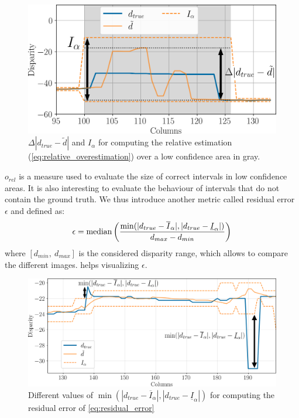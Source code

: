 \begin{figure}
    \centering
    \includegraphics[width=0.8\linewidth]{Images/Chap_5/relative_overestimation_row_230.png}
    \caption{$\Delta|d_{true}-\tilde{d}|$ and $I_\alpha$ for computing the relative estimation (\cref{eq:relative_overestimation}) over a low confidence area in gray.}
    \label{fig:relative_overestimation}
\end{figure}

$o_{rel}$ is a measure used to evaluate the size of correct intervals in low confidence areas. It is also interesting to evaluate the behaviour of intervals that do not contain the ground truth. We thus introduce another metric called residual error $\epsilon$ and defined as:
\begin{align}
    \epsilon=\operatorname*{median} \left( \dfrac{\min(|d_{true}-\overline{I}_\alpha|, |d_{true}-\underline{I}_\alpha|)}{d_{max}-d_{min}}\right)\label{eq:residual_error}
\end{align}
where $[d_{min}, ~d_{max}]$ is the considered disparity range, which allows to compare the different images.  helps visualizing $\epsilon$.

\begin{figure}
    \centering
    \includegraphics[width=0.8\linewidth]{Images/Chap_5/residual_error_row_108.png}
    \caption{Different values of $\min(|d_{true}-\overline{I}_\alpha|, |d_{true}-\underline{I}_\alpha|)$ for computing the residual error of \cref{eq:residual_error}}
    \label{fig:residual_error}
\end{figure}

